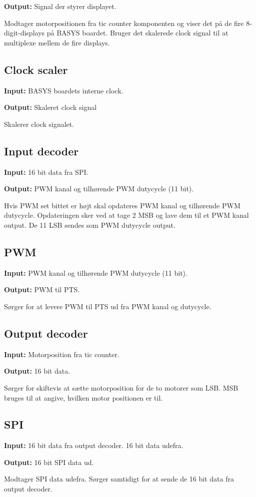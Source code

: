 \textbf{Output:} Signal der styrer displayet.

Modtager motorpositionen fra tic counter komponenten og viser det på de fire 8-digit-displays 
på BASYS boardet. Bruger det skalerede clock signal til at multiplexe mellem de 
fire displays.

\subsection*{Clock scaler}
\textbf{Input:} BASYS boardets interne clock.

\textbf{Output:} Skaleret clock signal

Skalerer clock signalet.

\subsection*{Input decoder}
\textbf{Input:} 16 bit data fra SPI.

\textbf{Output:} PWM kanal og tilhørende PWM dutycycle (11 bit).

Hvis PWM set bittet er højt skal opdateres PWM kanal og tilhørende PWM dutycycle.
Opdateringen sker ved at tage 2 MSB og lave dem til et PWM kanal output. De 11 
LSB sendes som PWM dutycycle output.

\subsection*{PWM}
\textbf{Input:} PWM kanal og tilhørende PWM dutycycle (11 bit).

\textbf{Output:} PWM til PTS.

Sørger for at levere PWM til PTS ud fra PWM kanal og dutycycle.

\subsection*{Output decoder}
\textbf{Input:} Motorposition fra tic counter.

\textbf{Output:} 16 bit data.

Sørger for skiftevis at sætte motorposition for de to motorer som LSB.
MSB bruges til at angive, hvilken motor positionen er til.


\subsection*{SPI}
\textbf{Input:} 16 bit data fra output decoder. 16 bit data udefra.

\textbf{Output:} 16 bit SPI data ud.

Modtager SPI data udefra. Sørger samtidigt for at sende de 16 bit data fra output decoder.





